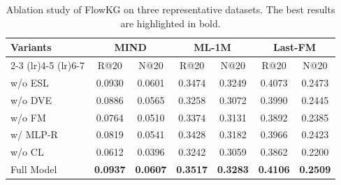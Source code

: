 


\begin{table}[t]
	\small
	\centering
	\setlength{\tabcolsep}{1.8pt}
	\caption{Ablation study of FlowKG on three representative datasets. The best results are highlighted in bold.}
	\label{tab:ablation}
	\begin{tabular}{l|cc|cc|cc}
		\toprule
		\multirow{2}{*}{Variants}
		& \multicolumn{2}{c|}{MIND}
		& \multicolumn{2}{c|}{ML-1M}
		& \multicolumn{2}{c}{Last-FM} \\
		\cmidrule(lr){2-3} \cmidrule(lr){4-5} \cmidrule(lr){6-7}
		& R@20 & N@20 & R@20 & N@20 & R@20 & N@20 \\
		\midrule
		w/o ESL & 0.0930 & 0.0601 & 0.3474 & 0.3249 & 0.4073 & 0.2473 \\
		w/o DVE & 0.0886 & 0.0565 & 0.3258 & 0.3072 & 0.3990 & 0.2445 \\
		w/o FM  & 0.0764 & 0.0510 & 0.3374 & 0.3131 & 0.3892 & 0.2385 \\
		w/ MLP-R & 0.0819 & 0.0541 & 0.3428 & 0.3182 & 0.3966 & 0.2423 \\
		w/o CL  & 0.0612 & 0.0396 & 0.3242 & 0.3059 & 0.3862 & 0.2200 \\
		\hline
		\rule{0pt}{2ex}Full Model
		& \textbf{0.0937} & \textbf{0.0607}
		& \textbf{0.3517} & \textbf{0.3283}
		& \textbf{0.4106} & \textbf{0.2509} \\
		\bottomrule
	\end{tabular}
\end{table}


